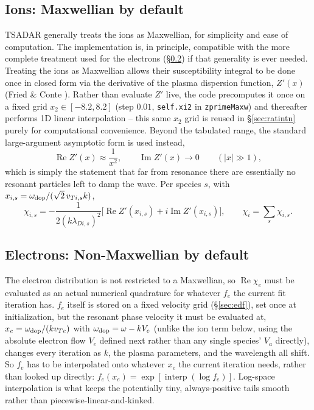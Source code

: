 \documentclass[11pt]{article}
\newcommand{\code}[1]{\texttt{#1}}
\begin{document}
\subsection{Ions: Maxwellian by default}\label{sec:ionchi}

TSADAR generally treats the ions as Maxwellian, for simplicity and ease of computation. The
implementation is, in principle, compatible with the more complete treatment used for the
electrons (\S\ref{sec:echi}) if that generality is ever needed. Treating the ions as
Maxwellian allows their susceptibility integral to be done once in closed form via the
derivative of the plasma dispersion function, $Z'(x)$
(Fried \& Conte \cite{fried1961}). Rather than evaluate $Z'$ live, the code precomputes it once on a fixed
grid $x_2\in[-8.2,8.2]$ (step $0.01$, \code{self.xi2} in \code{zprimeMaxw}) and
thereafter performs 1D linear interpolation -- this same $x_2$ grid is reused in
\S\ref{sec:ratintn} purely for computational convenience. Beyond the tabulated range, the standard large-argument asymptotic form is
used instead,
\begin{equation}
  \operatorname{Re}Z'(x)\approx\frac{1}{x^2}, \qquad \operatorname{Im}Z'(x)\to0
  \qquad(\vert x\vert\gg1),
\end{equation}
which is simply the statement that far from resonance there are essentially no resonant
particles left to damp the wave. Per species $s$, with $x_{i,s}=\omega_{\rm
dop}/(\sqrt2\,v_{Ti,s}k)$,
\begin{equation}
  \chi_{i,s} = -\frac{1}{2(k\lambda_{Di,s})^2}\Big[\operatorname{Re}Z'(x_{i,s})
  +i\operatorname{Im}Z'(x_{i,s})\Big], \qquad \chi_i=\sum_s\chi_{i,s}.
\end{equation}


\subsection{Electrons: Non-Maxwellian by default}\label{sec:echi}

The electron distribution is not restricted to a Maxwellian, so $\operatorname{Re}\chi_e$
must be evaluated as an actual numerical quadrature for whatever $f_e$ the current fit
iteration has. $f_e$ itself is stored on a fixed velocity grid (\S\ref{sec:edf}), set once
at initialization, but the resonant phase velocity it must be evaluated at,
$x_e=\omega_{\rm dop}/(kv_{Te})$ with $\omega_{\rm dop}=\omega-kV_e$ (unlike the ion term
below, using the absolute electron flow $V_e$ defined next rather than any single species'
$V_a$ directly), changes every iteration as $k$, the plasma parameters, and the wavelength
all shift. So $f_e$ has to be interpolated onto whatever $x_e$ the current iteration needs,
rather than looked up directly: $f_e(x_e)=\exp[\operatorname{interp}(\log f_e)]$. Log-space
interpolation is what keeps the potentially tiny, always-positive tails smooth rather than
piecewise-linear-and-kinked.
\end{document}
